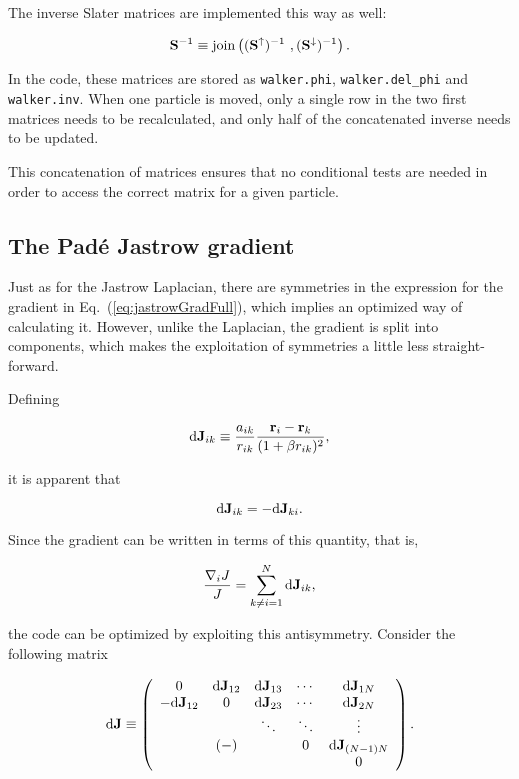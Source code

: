 The inverse Slater matrices are implemented this way as well:

\begin{equation}
 \mathbf{S}^{-1} \equiv \mathrm{join}\left((\mathbf{S}^\uparrow)^{-1}\,\,,(\mathbf{S}^\downarrow)^{-1}\right).
\end{equation}

In the code, these matrices are stored as \verb+walker.phi+, \verb+walker.del_phi+ and \verb+walker.inv+. When one particle is moved, only a single row in the two first matrices needs to be recalculated, and only half of the concatenated inverse needs to be updated.

This concatenation of matrices ensures that no conditional tests are needed in order to access the correct matrix for a given particle. 

\subsection{The Padé Jastrow gradient}
\label{sec:optJastGrad}

Just as for the Jastrow Laplacian, there are symmetries in the expression for the gradient in Eq.~(\ref{eq:jastrowGradFull}), which implies an optimized way of calculating it. However, unlike the Laplacian, the gradient is split into components, which makes the exploitation of symmetries a little less straight-forward. 

Defining

\begin{equation}
 \mathrm{d}\mathbf{J}_{ik}  \equiv \frac{a_{ik}}{r_{ik}}\frac{\mathbf{r}_i -  \mathbf{r}_k}{(1 + \beta r_{ik})^2},
\end{equation}

it is apparent that 

\begin{equation}
 \mathrm{d}\mathbf{J}_{ik} = -\mathrm{d}\mathbf{J}_{ki}.
\end{equation}

Since the gradient can be written in terms of this quantity, that is,

\begin{equation}
 \frac{\nabla_i J}{J} = \sum_{k \ne i = 1}^N \mathrm{d}\mathbf{J}_{ik},
\end{equation}

the code can be optimized by exploiting this antisymmetry. Consider the following matrix

\begin{equation}
\label{eq:jastrowDJ}
 \mathbf{\mathrm{d}J}\equiv \left( \begin{array}{ccccc}
0 & \mathrm{d}\mathbf{J}_{12} & \mathrm{d}\mathbf{J}_{13} & \cdots & \mathrm{d}\mathbf{J}_{1N} \\
 -\mathrm{d}\mathbf{J}_{12} & 0 & \mathrm{d}\mathbf{J}_{23} & \cdots & \mathrm{d}\mathbf{J}_{2N}  \\
 &  & \ddots & \ddots & \vdots \\
 & (-) &  & 0 & \mathrm{d}\mathbf{J}_{(N-1)N} \\
 &  &  &  & 0\end{array} \right).
\end{equation}

